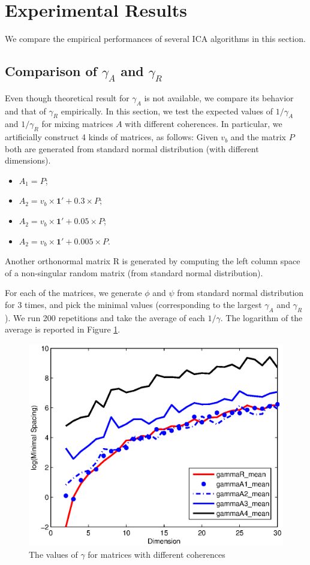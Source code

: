 \documentclass[twoside]{article}
\theoremstyle{definition}
\begin{document}
\section{Experimental Results}
\label{sec:ExpRes}
We compare the empirical performances of several ICA algorithms in this section. 
\subsection{Comparison of $\gamma_A$ and $\gamma_R$}
\label{subsec:comparisonGamma}
Even though theoretical result for $\gamma_A$ is not available, we compare its behavior and that of $\gamma_R$ empirically. 
In this section, we test the expected values of $1/\gamma_A$ and $1/\gamma_R$ for mixing matrices $A$ with different coherences.
In particular, we artificially construct 4 kinds of matrices, as follows:
Given $v_b$ and the matrix $P$ both are generated from standard normal distribution (with different dimensions).
\begin{itemize}
\vspace{-3mm}
\item $A_1 = P$;
\item $A_2 = v_b\times\boldsymbol{1}' + 0.3\times P$;
\item $A_2 = v_b\times\boldsymbol{1}' + 0.05\times P$;
\item $A_2 = v_b\times\boldsymbol{1}' + 0.005\times P$.
\end{itemize}
\vspace{-2mm}
Another orthonormal matrix R is generated by computing the left column space of a non-singular random matrix (from standard normal distribution).  

For each of the matrices, we generate $\phi$ and $\psi$ from standard normal distribution for 3 times, and pick the minimal values (corresponding to the largest $\gamma_A$ and $\gamma_R$).
We run 200 repetitions and take the average of each $1/\gamma$. The logarithm of the average is reported in Figure \ref{fig:miniSpacing}.
\begin{figure}[h]
\label{fig:miniSpacing}
\centering
	\includegraphics[width = \columnwidth]{miniSpacing}
\caption{The values of $\gamma$ for matrices with different coherences}
\end{figure}
\end{document}
